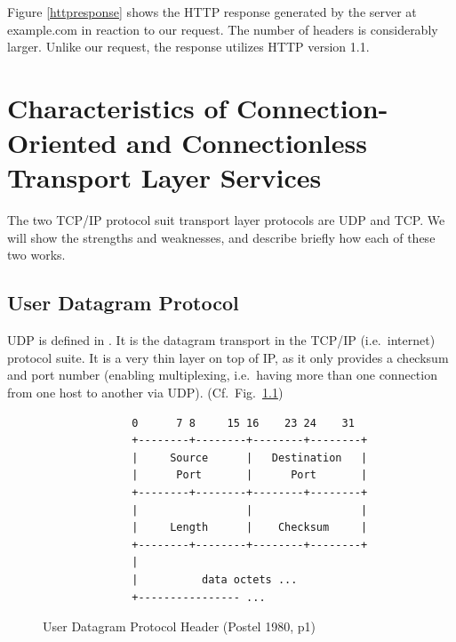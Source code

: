 \documentclass[10pt]{report}
\begin{document}
Figure \ref{httpresponse} shows the HTTP response generated by the server at
example.com in reaction to our request.  The number of headers is
considerably larger.  Unlike our request, the response utilizes HTTP
version 1.1.


\chapter{Characteristics of Connection-Oriented and Connectionless Transport
	Layer Services}
\thispagestyle{fancy}

The two TCP/IP protocol suit transport layer protocols are UDP and TCP.
We will show the strengths and weaknesses, and describe briefly how
each of these two works.

\section{User Datagram Protocol}

UDP is defined in \cite{rfc768}.  It is the datagram transport in the
TCP/IP (i.e.\ internet) protocol suite.  It is a very thin layer on top
of IP, as it only provides a checksum and port number (enabling
multiplexing, i.e.\ having more than one connection from one host to
another via UDP). (Cf.\ Fig.\ \ref{udpheader}) \cite{rfc1180}

\begin{figure}[h]
    \label{udpheader}
    \centering
	\begin{verbatim}
              0      7 8     15 16    23 24    31  
              +--------+--------+--------+--------+
              |     Source      |   Destination   |
              |      Port       |      Port       |
              +--------+--------+--------+--------+
              |                 |                 |
              |     Length      |    Checksum     |
              +--------+--------+--------+--------+
              |                                    
              |          data octets ...           
              +---------------- ...                
	\end{verbatim}
    \caption{User Datagram Protocol Header
	    (Postel 1980, p1) %
    }
\end{figure}
\end{document}

